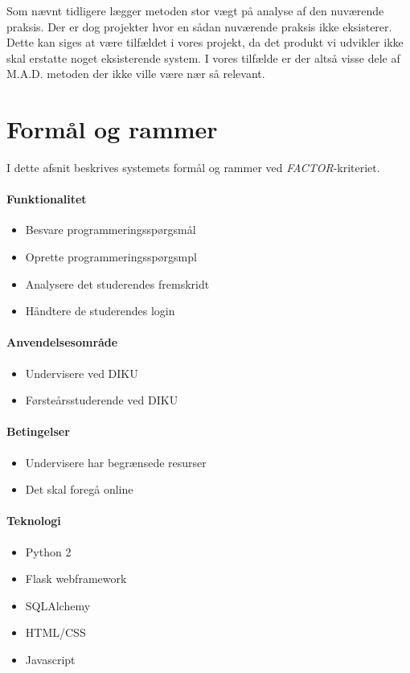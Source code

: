 \documentclass[11pt, a4paper]{article}
\begin{document}
Som nævnt tidligere lægger metoden stor vægt på analyse af den nuværende praksis. Der er dog projekter hvor en sådan nuværende praksis ikke eksisterer. Dette kan siges at være tilfældet i vores projekt, da det produkt vi udvikler ikke skal erstatte noget eksisterende system. I vores tilfælde er der altså visse dele af M.A.D. metoden der ikke ville være nær så relevant.

\newpage
\section{Formål og rammer}
\label{sec:formal_og_rammer}
I dette afsnit beskrives systemets formål og rammer ved \textit{FACTOR}-kriteriet.
\paragraph{Funktionalitet}
\begin{itemize}
    \item Besvare programmeringsspørgsmål
    \item Oprette programmeringsspørgsmpl
    \item Analysere det studerendes fremskridt
    \item Håndtere de studerendes login
\end{itemize}
\paragraph{Anvendelsesområde}
\begin{itemize}
    \item Undervisere ved DIKU
    \item Førsteårsstuderende ved DIKU
\end{itemize}
\paragraph{Betingelser}
\begin{itemize}
    \item Undervisere har begrænsede resurser
    \item Det skal foregå online
\end{itemize}
\paragraph{Teknologi}
\begin{itemize}
    \item Python 2
    \item Flask webframework
    \item SQLAlchemy
    \item HTML/CSS
    \item Javascript
\end{itemize}
\end{document}
